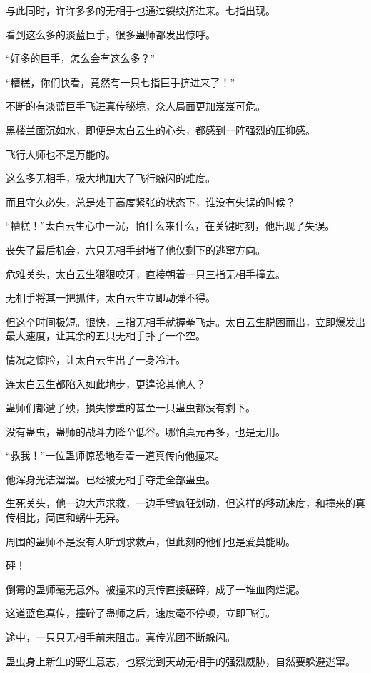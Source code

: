 \begin{this_body}
与此同时，许许多多的无相手也通过裂纹挤进来。七指出现。

看到这么多的淡蓝巨手，很多蛊师都发出惊呼。

“好多的巨手，怎么会有这么多？”

“糟糕，你们快看，竟然有一只七指巨手挤进来了！”

不断的有淡蓝巨手飞进真传秘境，众人局面更加岌岌可危。

黑楼兰面沉如水，即便是太白云生的心头，都感到一阵强烈的压抑感。

飞行大师也不是万能的。

这么多无相手，极大地加大了飞行躲闪的难度。

而且守久必失，总是处于高度紧张的状态下，谁没有失误的时候？

“糟糕！”太白云生心中一沉，怕什么来什么，在关键时刻，他出现了失误。

丧失了最后机会，六只无相手封堵了他仅剩下的逃窜方向。

危难关头，太白云生狠狠咬牙，直接朝着一只三指无相手撞去。

无相手将其一把抓住，太白云生立即动弹不得。

但这个时间极短。很快，三指无相手就握拳飞走。太白云生脱困而出，立即爆发出最大速度，让其余的五只无相手扑了一个空。

情况之惊险，让太白云生出了一身冷汗。

连太白云生都陷入如此地步，更遑论其他人？

蛊师们都遭了殃，损失惨重的甚至一只蛊虫都没有剩下。

没有蛊虫，蛊师的战斗力降至低谷。哪怕真元再多，也是无用。

“救我！”一位蛊师惊恐地看着一道真传向他撞来。

他浑身光洁溜溜。已经被无相手夺走全部蛊虫。

生死关头，他一边大声求救，一边手臂疯狂划动，但这样的移动速度，和撞来的真传相比，简直和蜗牛无异。

周围的蛊师不是没有人听到求救声，但此刻的他们也是爱莫能助。

砰！

倒霉的蛊师毫无意外。被撞来的真传直接碾碎，成了一堆血肉烂泥。

这道蓝色真传，撞碎了蛊师之后，速度毫不停顿，立即飞行。

途中，一只只无相手前来阻击。真传光团不断躲闪。

蛊虫身上新生的野生意志，也察觉到天劫无相手的强烈威胁，自然要躲避逃窜。


\end{this_body}
